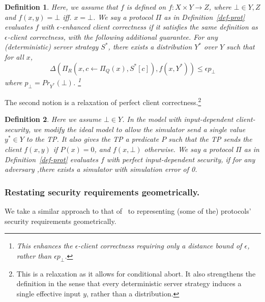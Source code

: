 \documentclass[a4paper]{article}
\newtheorem{definition}{Definition}[section]
\newcommand{\R}{\mathbb{R}}
\begin{document}
\begin{definition}\label{def-enh-cl}
Here, we assume that $f$ is defined on $f:X\times Y \rightarrow Z$,  where $\bot\in Y,Z$ and $f(x,y)=\bot$ iff. $x=\bot$.	
We say a protocol $\Pi$ as in Definition~\ref{def-prot} evaluates $f$ with  $\epsilon$-enhanced client correctness if it satisfies the same definition as $\epsilon$-client correctness, with the following additional guarantee.
For any (deterministic) server strategy $S^*$, there exists a distribution $Y^*$ over $Y$ such that for all $x$,
\[\Delta(\Pi_R(x,c\leftarrow \Pi_Q(x),S^*[c]), f(x,Y^*))\leq \epsilon p_{\bot}\] where $p_\bot=Pr_{Y^*}(\bot)$. \footnote{This enhances the $\epsilon$-client correctness requiring only a distance bound 
of $\epsilon$, rather than $\epsilon p_\bot$.} 
\end{definition}

The second notion is a relaxation of perfect client correctness.\footnote{This is a relaxation as it allows for conditional abort. It also strengthens the definition in the sense that every deterministic server strategy induces a single effective input $y$, rather than a distribution.}

\begin{definition}
Here we assume $\bot\in Y$.	
In the model with input-dependent client-security, we modify the ideal model to allow the simulator send a single value $y^*\in Y$ to the TP.	
It also gives the TP a predicate $P$ such that the TP sends the client $f(x,y)$ if $P(x)=0$, and $f(x,\bot)$ otherwise.	
We say a protocol $\Pi$ as in Definition~\ref{def-prot} evaluates $f$
with perfect input-dependent security, if for any adversary ,there exists a simulator with simulation error of 0.
\end{definition}

\subsubsection{Restating security requirements geometrically.}

We take a similar approach to that of~\cite{Ash14} 
to representing (some of the) protocols' security requirements geometrically.
\end{document}
